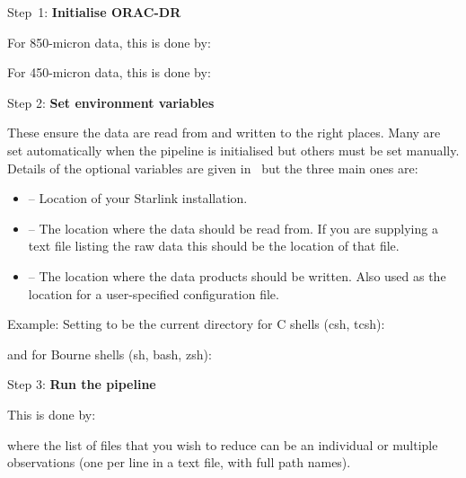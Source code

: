 \begin{aligndesc}
\item[Step~1:]
\textbf{Initialise ORAC-DR}

For 850-micron data, this is done by:
\begin{terminalv}
\end{terminalv}

\vspace{0.2cm}

For 450-micron data, this is done by:

\begin{terminalv}
\end{terminalv}

\vspace{0.2cm}

\item[Step 2:]
\textbf{Set environment variables}

These ensure the data are read from and written to the right
places. Many are set automatically when the pipeline is initialised
but others must be set manually. Details of the optional variables are
given in \pipelinesun\ but the three main ones are:

\begin{itemize}\itemsep-0.1em
\item {} -- Location of your Starlink installation.
\item {} -- The location where the data should be read from.
If you are supplying a text file listing the raw data this should be the
location of that file.
\item {} -- The location where the data products should be
written. Also used as the location for a user-specified configuration file.
\end{itemize}

Example: Setting  to be the current
directory for C shells (csh, tcsh):

\begin{terminalv}
\end{terminalv}

\newpage 

and for Bourne shells (sh, bash, zsh):

\begin{terminalv}
\end{terminalv}


\item[Step 3:]
\textbf{Run the pipeline}

This is done by:
\begin{terminalv}
\end{terminalv}

\vspace{0.2cm}

where the list of files that you wish to reduce can be
an individual or multiple observations (one per line in a text file, 
with full path names).

\end{aligndesc}


